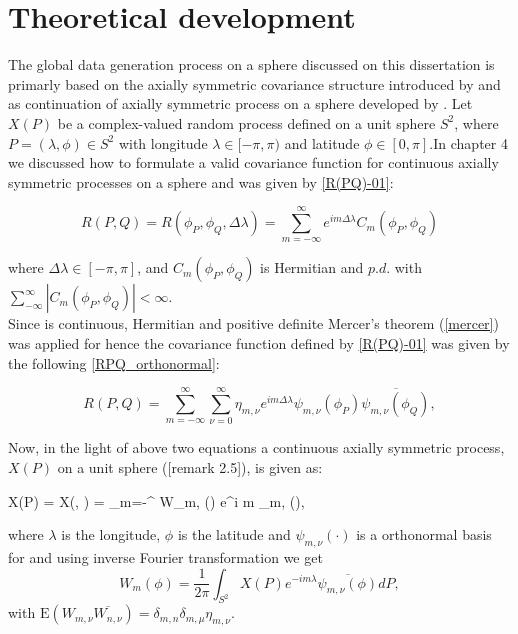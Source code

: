 



\section{Theoretical development}

The global data generation process on a sphere discussed on this dissertation is primarly based on the axially symmetric covariance structure introduced by \cite{Jones1963} and as continuation of axially symmetric process on a sphere developed by \cite{Huang2012}.  Let $X(P)$ be a complex-valued random process defined on a unit sphere $S^2$, where $P = (\lambda, \phi) \in S^2$ with longitude $\lambda \in [-\pi, \pi)$ and latitude $\phi \in [0, \pi]$.In chapter 4 we discussed how to formulate a valid covariance function for continuous axially symmetric processes on a sphere and was given by \ref{R(PQ)-01}:
		
	\[ 
		R(P,Q) = R(\phi_P,\phi_Q,\Delta\lambda) = \sum_{m = -\infty}^{\infty}e^{im\Delta\lambda}C_m(\phi_P,\phi_Q)
	\]
		
	where $\Delta\lambda \in [-\pi,\pi]$, and $C_m(\phi_P,\phi_Q)$ is Hermitian and $p.d.$ with $\sum_{-\infty}^{\infty}|C_m(\phi_P,\phi_Q)|<\infty$.\\
		
	Since \Cm is continuous, Hermitian and positive definite Mercer's theorem (\ref{mercer}) was applied for \Cm hence the covariance function defined by \ref{R(PQ)-01} was given by the following \ref{RPQ_orthonormal}:
		
	\[
		R(P,Q) = \sum_{m=-\infty}^{\infty}\sum_{\nu=0}^{\infty} \eta_{m,\nu}e^{im\Delta\lambda}\psi_{m,\nu}(\phi_P)\overline{\psi_{m,\nu}(\phi_Q)},
	\]
		
	Now, in the light of above two equations a continuous axially symmetric process, $X(P)$ on a unit sphere (\cite{Huang2012}[remark 2.5]), is given as:
		
	\beq \label{process_sphere}
	X(P) = X(\phi, \lambda) = \sum_{m=-\infty}^{\infty} W_{m, \nu}(\phi) e^{i m \lambda}\psi_{m,\nu} (\phi),
	\eeq
		
	where $\lambda$ is the longitude, $\phi$ is the latitude and $\psi_{m,\nu}(\cdot)$ is a orthonormal basis for \Cm and using inverse Fourier transformation we get
	\[
		W_m(\phi) = \frac{1}{2\pi} \int_{S^2} X(P) e^{-im\lambda} \overline{\psi_{m,\nu} (\phi)} dP,
	\]
	with $\mbox{E}(W_{m, \nu} \overline{W_{n,\nu}}) = \delta_{m,n}\delta_{m,\mu}\eta_{m,\nu}$. \\
		
